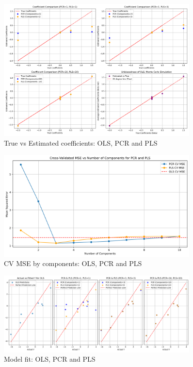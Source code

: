 \documentclass[11pt,twoside,a4paper]{article}
\begin{document}
\begin{figure}[H]
    \centering
    \includegraphics[width=0.9\textwidth]{First_plot_third_simulation.png}
    \caption{True vs Estimated coefficients: OLS, PCR and PLS}
    \label{fig:Severe_multicollinear_data_analysis}
\end{figure}

\begin{figure}[H]
    \centering
    \includegraphics[width=0.9\textwidth]{Second_plot_third_simulation.png}
    \caption{CV MSE by components: OLS, PCR and PLS}
    \label{fig:Severe_multicollinear_data_analysis}
\end{figure}

\begin{figure}[H]
    \centering
    \includegraphics[width=0.9\textwidth]{Third_plot_third_simulation.png}
    \caption{Model fit: OLS, PCR and PLS}
    \label{fig:Severe_multicollinear_data_analysis}
\end{figure}
\end{document}
